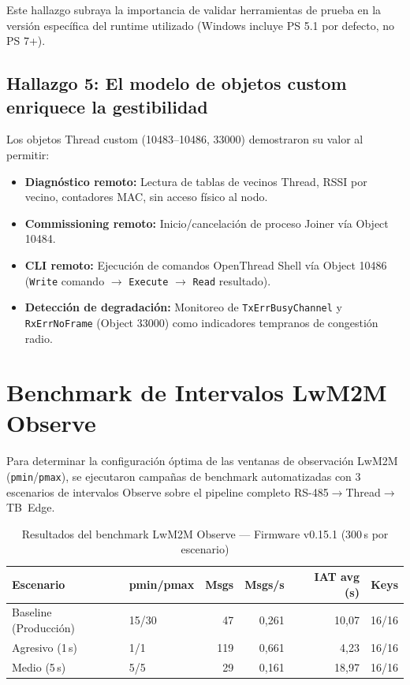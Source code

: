 \documentclass[11pt,a4paper]{article}
\begin{document}
\noindent Este hallazgo subraya la importancia de validar herramientas de prueba en la versión específica del runtime utilizado (Windows incluye PS 5.1 por defecto, no PS 7+).

\subsection{Hallazgo 5: El modelo de objetos custom enriquece la gestibilidad}

Los objetos Thread custom (10483--10486, 33000) demostraron su valor al permitir:
\begin{itemize}[leftmargin=1.2cm]
    \item \textbf{Diagnóstico remoto:} Lectura de tablas de vecinos Thread, RSSI por vecino, contadores MAC, sin acceso físico al nodo.
    \item \textbf{Commissioning remoto:} Inicio/cancelación de proceso Joiner vía Object 10484.
    \item \textbf{CLI remoto:} Ejecución de comandos OpenThread Shell vía Object 10486 (\texttt{Write} comando $\rightarrow$ \texttt{Execute} $\rightarrow$ \texttt{Read} resultado).
    \item \textbf{Detección de degradación:} Monitoreo de \texttt{TxErrBusyChannel} y \texttt{RxErrNoFrame} (Object 33000) como indicadores tempranos de congestión radio.
\end{itemize}

\section{Benchmark de Intervalos LwM2M Observe}
\label{sec:benchmark-observe}

Para determinar la configuración óptima de las ventanas de observación LwM2M (\texttt{pmin}/\texttt{pmax}),
se ejecutaron campañas de benchmark automatizadas con 3 escenarios de intervalos Observe
sobre el pipeline completo RS-485$\rightarrow$Thread$\rightarrow$TB~Edge.

\begin{table}[H]
\centering
\caption{Resultados del benchmark LwM2M Observe — Firmware v0.15.1 (300\,s por escenario)}
\label{tab:lwm2m-benchmark}
\begin{tabular}{l l r r r r}
\toprule
\textbf{Escenario} & \textbf{pmin/pmax} & \textbf{Msgs} & \textbf{Msgs/s} & \textbf{IAT avg (s)} & \textbf{Keys} \\
\midrule
Baseline (Producción) & 15/30 & 47 & 0,261 & 10,07 & 16/16 \\
Agresivo (1\,s) & 1/1 & 119 & 0,661 & 4,23 & 16/16 \\
Medio (5\,s) & 5/5 & 29 & 0,161 & 18,97 & 16/16 \\
\bottomrule
\end{tabular}
\end{table}
\end{document}
